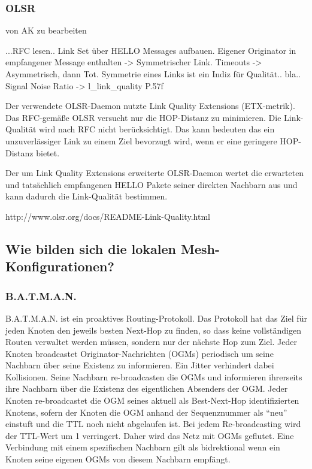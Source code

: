 \documentclass[a4paper,10pt]{article}
\begin{document}

\subsubsection*{OLSR}

von AK zu bearbeiten

...RFC lesen..
Link Set über HELLO Messages aufbauen. Eigener Originator in 
empfangener Message enthalten -> Symmetrischer Link. Timeouts -> Asymmetrisch, dann Tot.
Symmetrie eines Links ist ein Indiz für Qualität.. bla..
Signal Noise Ratio -> l\_link\_quality P.57f

Der verwendete OLSR-Daemon nutzte Link Quality Extensions (ETX-metrik).
Das RFC-gemäße OLSR versucht nur die HOP-Distanz zu minimieren. Die Link-Qualität
wird nach RFC nicht berücksichtigt. Das kann bedeuten das ein unzuverlässiger Link zu einem Ziel bevorzugt wird,
wenn er eine geringere HOP-Distanz bietet.

Der um Link Quality Extensions erweiterte OLSR-Daemon wertet die erwarteten und tatsächlich empfangenen
HELLO Pakete seiner direkten Nachbarn aus und kann dadurch die Link-Qualität bestimmen.

http://www.olsr.org/docs/README-Link-Quality.html

\subsection{Wie bilden sich die lokalen Mesh-Konfigurationen?}


\subsubsection*{B.A.T.M.A.N.}

B.A.T.M.A.N. ist ein proaktives Routing-Protokoll.
Das Protokoll hat das Ziel für jeden Knoten den jeweils besten Next-Hop zu finden, so dass keine vollständigen Routen verwaltet werden müssen, sondern nur der nächste Hop zum Ziel.
Jeder Knoten broadcastet Originator-Nachrichten (OGMs) periodisch um seine Nachbarn über seine Existenz zu informieren.
Ein Jitter verhindert dabei Kollisionen.
Seine Nachbarn re-broadcasten die OGMs und informieren ihrerseits ihre Nachbarn über die Existenz des eigentlichen Absenders der OGM.
Jeder Knoten re-broadcastet die OGM seines aktuell als Best-Next-Hop identifizierten Knotens, sofern der Knoten die OGM anhand der Sequenznummer als "`neu"' einstuft und die TTL noch nicht abgelaufen ist.
Bei jedem Re-broadcasting wird der TTL-Wert um 1 verringert.
Daher wird das Netz mit OGMs geflutet.
Eine Verbindung mit einem spezifischen Nachbarn gilt als bidrektional wenn ein Knoten seine eigenen OGMs von diesem Nachbarn empfängt.
\end{document}
